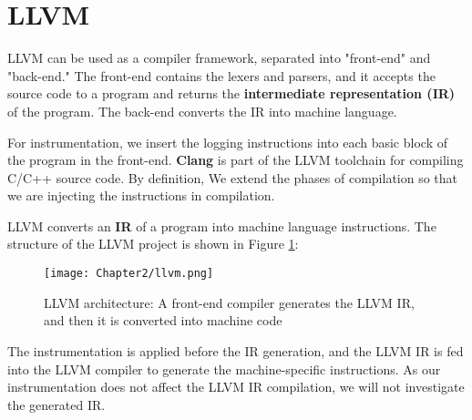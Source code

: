 \section{LLVM} \label{sec:2-llvm}

 \cite{llvm,lattner2004llvm}

\vspace{\baselineskip}

LLVM can be used as a compiler framework, separated into "front-end" and "back-end." The front-end contains the lexers and parsers, and it accepts the source code to a program and returns the \textbf{intermediate representation (IR)} of the program. The back-end converts the IR into machine language.

\vspace{\baselineskip}

For instrumentation, we insert the logging instructions into each basic block of the program in the front-end. \textbf{Clang} is part of the LLVM toolchain for compiling C/C++ source code. By definition, \cite{clang} We extend the phases of compilation so that we are injecting the instructions in compilation. 

\vspace{\baselineskip}

LLVM converts an \textbf{IR} of a program into machine language instructions. The structure of the LLVM project is shown in Figure \ref{fig:llvm}:

\begin{figure}[htpb]
    \texttt{[image: Chapter2/llvm.png]}
    \centering
    \captionsetup{justification=centering}
    \caption{LLVM architecture: A front-end compiler generates the LLVM IR, and then it is converted into machine code \cite{omni_sci}}
    \label{fig:llvm}
\end{figure}

The instrumentation is applied before the IR generation, and the LLVM IR is fed into the LLVM compiler to generate the machine-specific instructions. As our instrumentation does not affect the LLVM IR compilation, we will not investigate the generated IR.

